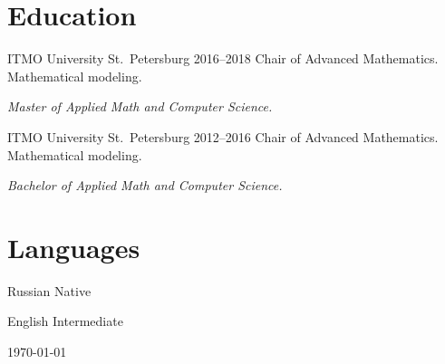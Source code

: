 \documentclass{cv}
\begin{document}
\section{Education}

\begin{cvblock}{%
		\blocktitle
		{ITMO University}
		{St.~Petersburg}
		{}
		{2016--2018}}
	Chair of Advanced Mathematics. Mathematical modeling.
	\vspace{1em}

	\textit{Master of Applied Math and Computer Science.}
\end{cvblock}

\begin{cvblock}{%
		\blocktitle
		{ITMO University}
		{St.~Petersburg}
		{}
		{2012--2016}}
	Chair of Advanced Mathematics. Mathematical modeling.
	\vspace{1em}

	\textit{Bachelor of Applied Math and Computer Science.}
\end{cvblock}

\section{Languages}

\begin{cvblock}{Russian}
	Native
\end{cvblock}

\begin{cvblock}{English}
	Intermediate
\end{cvblock}

\vfill
\begin{center}
	\monthyear\today
\end{center}
\end{document}
